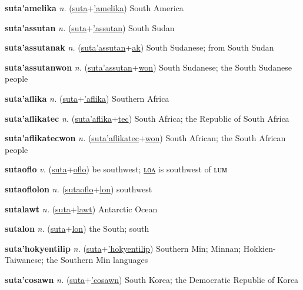 \textbf{\hypertarget{suta'amelika}{suta'amelika}} \textit{n.} (\hyperlink{suta}{suta}+\allowbreak \hyperlink{'amelika}{'amelika})
South America

\textbf{\hypertarget{suta'assutan}{suta'assutan}} \textit{n.} (\hyperlink{suta}{suta}+\allowbreak \hyperlink{'assutan}{'assutan})
South Sudan

\textbf{\hypertarget{suta'assutanak}{suta'assutanak}} \textit{n.} (\hyperlink{suta'assutan}{suta'assutan}+\allowbreak \hyperlink{ak}{ak})
South Sudanese; from South Sudan

\textbf{\hypertarget{suta'assutanwon}{suta'assutanwon}} \textit{n.} (\hyperlink{suta'assutan}{suta'assutan}+\allowbreak \hyperlink{won}{won})
South Sudanese; the South Sudanese people

\textbf{\hypertarget{suta'aflika}{suta'aflika}} \textit{n.} (\hyperlink{suta}{suta}+\allowbreak \hyperlink{'aflika}{'aflika})
Southern Africa

\textbf{\hypertarget{suta'aflikatec}{suta'aflikatec}} \textit{n.} (\hyperlink{suta'aflika}{suta'aflika}+\allowbreak \hyperlink{tec}{tec})
South Africa; the Republic of South Africa

\textbf{\hypertarget{suta'aflikatecwon}{suta'aflikatecwon}} \textit{n.} (\hyperlink{suta'aflikatec}{suta'aflikatec}+\allowbreak \hyperlink{won}{won})
South African; the South African people

\textbf{\hypertarget{sutaoflo}{sutaoflo}} \textit{v.} (\hyperlink{suta}{suta}+\allowbreak \hyperlink{oflo}{oflo})
be southwest; \hyperlink{sutaoflolon}{ʟᴏᴧ} is southwest of ʟᴜᴍ

\textbf{\hypertarget{sutaoflolon}{sutaoflolon}} \textit{n.} (\hyperlink{sutaoflo}{sutaoflo}+\allowbreak \hyperlink{lon}{lon})
southwest

\textbf{\hypertarget{sutalawt}{sutalawt}} \textit{n.} (\hyperlink{suta}{suta}+\allowbreak \hyperlink{lawt}{lawt})
Antarctic Ocean

\textbf{\hypertarget{sutalon}{sutalon}} \textit{n.} (\hyperlink{suta}{suta}+\allowbreak \hyperlink{lon}{lon})
the South; south

\textbf{\hypertarget{suta'hokyentilip}{suta'hokyentilip}} \textit{n.} (\hyperlink{suta}{suta}+\allowbreak \hyperlink{'hokyentilip}{'hokyentilip})
Southern Min; Minnan; Hokkien-Taiwanese; the Southern Min languages

\textbf{\hypertarget{suta'cosawn}{suta'cosawn}} \textit{n.} (\hyperlink{suta}{suta}+\allowbreak \hyperlink{'cosawn}{'cosawn})
South Korea; the Democratic Republic of Korea

